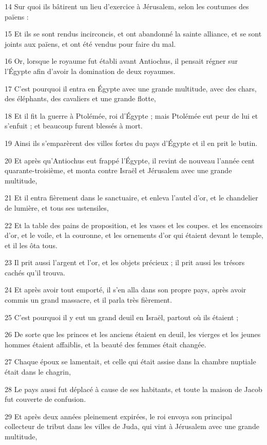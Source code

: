 \par 14 Sur quoi ils bâtirent un lieu d'exercice à Jérusalem, selon les coutumes des païens :
\par 15 Et ils se sont rendus incirconcis, et ont abandonné la sainte alliance, et se sont joints aux païens, et ont été vendus pour faire du mal.
\par 16 Or, lorsque le royaume fut établi avant Antiochus, il pensait régner sur l'Égypte afin d'avoir la domination de deux royaumes.
\par 17 C'est pourquoi il entra en Égypte avec une grande multitude, avec des chars, des éléphants, des cavaliers et une grande flotte,
\par 18 Et il fit la guerre à Ptolémée, roi d'Égypte ; mais Ptolémée eut peur de lui et s'enfuit ; et beaucoup furent blessés à mort.
\par 19 Ainsi ils s'emparèrent des villes fortes du pays d'Égypte et il en prit le butin.
\par 20 Et après qu'Antiochus eut frappé l'Égypte, il revint de nouveau l'année cent quarante-troisième, et monta contre Israël et Jérusalem avec une grande multitude,
\par 21 Et il entra fièrement dans le sanctuaire, et enleva l'autel d'or, et le chandelier de lumière, et tous ses ustensiles,
\par 22 Et la table des pains de proposition, et les vases et les coupes. et les encensoirs d'or, et le voile, et la couronne, et les ornements d'or qui étaient devant le temple, et il les ôta tous.
\par 23 Il prit aussi l'argent et l'or, et les objets précieux ; il prit aussi les trésors cachés qu'il trouva.
\par 24 Et après avoir tout emporté, il s'en alla dans son propre pays, après avoir commis un grand massacre, et il parla très fièrement.
\par 25 C'est pourquoi il y eut un grand deuil en Israël, partout où ils étaient ;
\par 26 De sorte que les princes et les anciens étaient en deuil, les vierges et les jeunes hommes étaient affaiblis, et la beauté des femmes était changée.
\par 27 Chaque époux se lamentait, et celle qui était assise dans la chambre nuptiale était dans le chagrin,
\par 28 Le pays aussi fut déplacé à cause de ses habitants, et toute la maison de Jacob fut couverte de confusion.
\par 29 Et après deux années pleinement expirées, le roi envoya son principal collecteur de tribut dans les villes de Juda, qui vint à Jérusalem avec une grande multitude,
